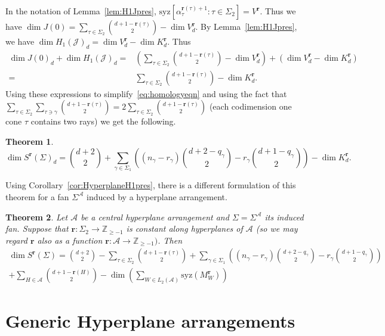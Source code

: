 \documentclass[11pt, reqno]{amsart}
\newcommand{\ZZ}{\mathbb{Z}}
\newcommand{\br}{\mathbf{r}}
\newcommand{\calJ}{\mathcal{J}}
\newcommand{\A}{\mathcal{A}}
\newcommand{\syz}{\mathrm{syz}}
\newtheorem{theorem}{Theorem}[section]
\theoremstyle{definition}
\theoremstyle{remark}
\numberwithin{equation}{section}
\begin{document}
In the notation of Lemma~\ref{lem:H1Jpres}, $\syz [\alpha_{\tau}^{\br(\tau)+1}: \tau\in\Sigma_2]=V^{\br}$.  Thus we have $\dim J(0)=\sum_{\tau\in \Sigma_2} \binom{d+1-\br(\tau)}{2}-\dim V^{\br}_d$.  By Lemma~\ref{lem:H1Jpres}, we have $\dim H_1(\calJ)_d=\dim V^{\br}_d-\dim K^\br_d$.  Thus
\begin{align*}
\dim J(0)_d+\dim H_1(\calJ)_d = &  (\sum_{\tau\in \Sigma_2} \binom{d+1-\br(\tau)}{2}-\dim V^{\br}_d)+(\dim V^{\br}_d-\dim K^\br_d)\\
= & \sum_{\tau\in \Sigma_2} \binom{d+1-\br(\tau)}{2}-\dim K^\br_d.
\end{align*}
Using these expressions to simplify~\eqref{eq:homologyeqn} and using the fact that $\sum\limits_{\tau\in\Sigma_2}\sum\limits_{\tau\ni\gamma} \binom{d+1-\br(\tau)}{2}=2\sum\limits_{\tau\in\Sigma_2}\binom{d+1-\br(\tau)}{2}$ (each codimension one cone $\tau$ contains two rays) we get the following.

\begin{theorem}
\[
\dim S^{\br}(\Sigma)_d=\binom{d+2}{2}+\sum_{\gamma\in\Sigma_1} \left( (n_\gamma-r_\gamma)\binom{d+2-q_\gamma}{2}-r_\gamma\binom{d+1-q_\gamma}{2} \right) -\dim K^\br_d.
\]
\end{theorem}

Using Corollary~\ref{cor:HyperplaneH1pres}, there is a different formulation of this theorem for a fan $\Sigma^\A$ induced by a hyperplane arrangement.

\begin{theorem}
Let $\A$ be a central hyperplane arrangement and $\Sigma=\Sigma^\A$ its induced fan.  Suppose that $\br:\Sigma_2\to\ZZ_{\ge -1}$ is constant along hyperplanes of $\A$ (so we may regard $\br$ also as a function $\br:\A\to \ZZ_{\ge -1})$.  Then
\begin{multline*}
\dim S^{\br}(\Sigma)=\binom{d+2}{2}-\sum_{\tau\in\Sigma_2}\binom{d+1-\br(\tau)}{2}+\sum_{\gamma\in\Sigma_1} \left( (n_\gamma-r_\gamma)\binom{d+2-q_\gamma}{2}-r_\gamma\binom{d+1-q_\gamma}{2} \right)\\
+\sum_{H\in\A}\binom{d+1-\br(H)}{2}-\dim\left(\sum_{W\in L_2(\A)} \syz(M^\br_W)\right)
\end{multline*}

\end{theorem}

\section{Generic Hyperplane arrangements}
\end{document}
